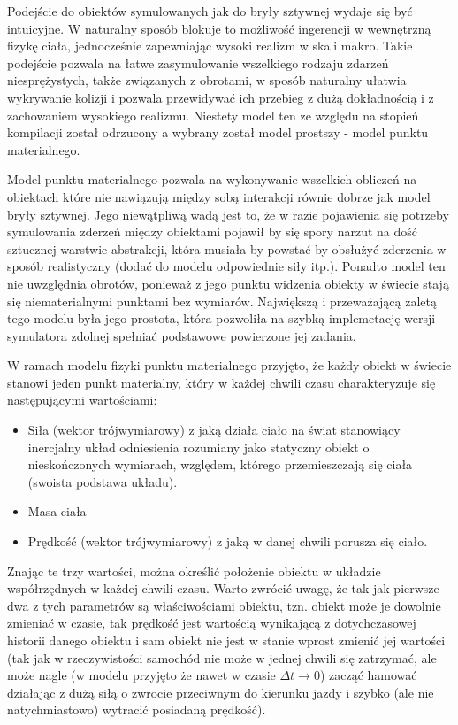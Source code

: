\par{
Podejście do obiektów symulowanych jak do bryły sztywnej wydaje się być intuicyjne. W naturalny sposób blokuje to możliwość ingerencji w wewnętrzną fizykę ciała, jednocześnie zapewniając wysoki realizm w skali makro.
Takie podejście pozwala na łatwe zasymulowanie wszelkiego rodzaju zdarzeń niesprężystych, także związanych z obrotami, w sposób naturalny ułatwia wykrywanie kolizji i pozwala przewidywać ich przebieg z dużą dokładnością i z zachowaniem wysokiego realizmu.
Niestety model ten ze względu na stopień kompilacji został odrzucony a wybrany został model prostszy - model punktu materialnego.
\par{
Model punktu materialnego pozwala na wykonywanie wszelkich obliczeń na obiektach które nie nawiązują między sobą interakcji równie dobrze jak model bryły sztywnej. Jego niewątpliwą wadą jest to, że w razie pojawienia się potrzeby symulowania zderzeń między obiektami pojawił by się spory narzut na dość sztucznej warstwie abstrakcji, która musiała by powstać by obsłużyć zderzenia w sposób realistyczny (dodać do modelu odpowiednie siły itp.).
Ponadto model ten nie uwzględnia obrotów, ponieważ z jego punktu widzenia obiekty w świecie stają się niematerialnymi punktami bez wymiarów.
Największą i przeważającą zaletą tego modelu była jego prostota, która pozwoliła na szybką implemetację wersji symulatora zdolnej spełniać podstawowe powierzone jej zadania. 
}
\par{
W ramach modelu fizyki punktu materialnego przyjęto, że każdy obiekt w świecie stanowi jeden punkt materialny, który w każdej chwili czasu charakteryzuje się następującymi wartościami:
\begin{itemize}
\item Siła (wektor trójwymiarowy) z jaką działa ciało na świat stanowiący inercjalny układ odniesienia rozumiany jako statyczny obiekt o nieskończonych wymiarach, względem, którego przemieszczają się ciała (swoista podstawa układu).
\item Masa ciała
\item Prędkość (wektor trójwymiarowy) z jaką w danej chwili porusza się ciało.
\end{itemize}
Znając te trzy wartości, można określić położenie obiektu w układzie współrzędnych w każdej chwili czasu.
Warto zwrócić uwagę, że tak jak pierwsze dwa z tych parametrów są właściwościami obiektu, tzn. obiekt może je dowolnie zmieniać w czasie, tak prędkość jest wartością wynikającą z dotychczasowej historii danego obiektu i sam obiekt nie jest w stanie wprost zmienić jej wartości (tak jak w rzeczywistości samochód nie może w jednej chwili się zatrzymać, ale może nagle (w modelu przyjęto że nawet w czasie $\Delta t \longrightarrow 0$) zacząć hamować działając z dużą siłą o zwrocie przeciwnym do kierunku jazdy i szybko (ale nie natychmiastowo) wytracić posiadaną prędkość).
}

}

